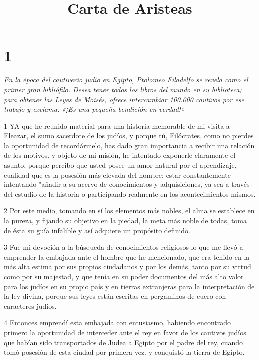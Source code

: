 

\title{Carta de Aristeas}

\chapter{1}

\par \textit{En la época del cautiverio judío en Egipto, Ptolomeo Filadelfo se revela como el primer gran bibliófilo. Desea tener todos los libros del mundo en su biblioteca; para obtener las Leyes de Moisés, ofrece intercambiar 100.000 cautivos por ese trabajo y exclama: «¡Es una pequeña bendición en verdad!»}

\par 1 YA que he reunido material para una historia memorable de mi visita a Eleazar, el sumo sacerdote de los judíos, y porque tú, Filócrates, como no pierdes la oportunidad de recordármelo, has dado gran importancia a recibir una relación de los motivos. y objeto de mi misión, he intentado exponerle claramente el asunto, porque percibo que usted posee un amor natural por el aprendizaje, cualidad que es la posesión más elevada del hombre: estar constantemente intentando "añadir a su acervo de conocimientos y adquisiciones, ya sea a través del estudio de la historia o participando realmente en los acontecimientos mismos.

\par 2 Por este medio, tomando en sí los elementos más nobles, el alma se establece en la pureza, y fijando su objetivo en la piedad, la meta más noble de todas, toma de ésta su guía infalible y así adquiere un propósito definido.

\par 3 Fue mi devoción a la búsqueda de conocimientos religiosos lo que me llevó a emprender la embajada ante el hombre que he mencionado, que era tenido en la más alta estima por sus propios ciudadanos y por los demás, tanto por su virtud como por su majestad, y que tenía en su poder documentos del más alto valor para los judíos en su propio país y en tierras extranjeras para la interpretación de la ley divina, porque sus leyes están escritas en pergaminos de cuero con caracteres judíos.

\par 4 Entonces emprendí esta embajada con entusiasmo, habiendo encontrado primero la oportunidad de interceder ante el rey en favor de los cautivos judíos que habían sido transportados de Judea a Egipto por el padre del rey, cuando tomó posesión de esta ciudad por primera vez. y conquistó la tierra de Egipto.

